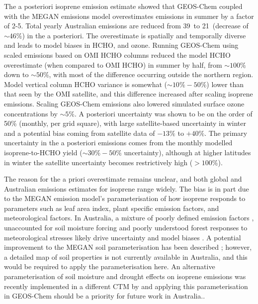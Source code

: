   The a posteriori isoprene emission estimate showed that GEOS-Chem coupled with the MEGAN emissions model overestimates emissions in summer by a factor of 2-5.
  Total yearly Australian emissions are reduced from 39\tgpyr ~to 21\tgpyr ~(decrease of $\sim{46}\%$) in the a posteriori.
  The overestimate is spatially and temporally diverse and leads to model biases in HCHO, and ozone.
  Running GEOS-Chem using scaled emissions based on OMI HCHO columns reduced the model HCHO overestimate (when compared to OMI HCHO) in summer by half, from $\sim{100\%}$ down to $\sim{50\%}$, with most of the difference occurring outside the northern region.
  Model vertical column HCHO variance is somewhat ($\sim{10\%-50\%}$) lower than that seen by the OMI satellite, and this difference increased after scaling isoprene emissions.
  Scaling GEOS-Chem emissions also lowered simulated surface ozone concentrations by $\sim 5\%$.
  A posteriori uncertainty was shown to be on the order of 50\%  (monthly, per grid square), with large satellite-based uncertainty in winter and a potential bias coming from satellite data of $-13\%$ to $+40\%$.
  The primary uncertainty in the a posteriori emissions comes from the monthly modelled isoprene-to-HCHO yield ($\sim 30\%-50\%$ uncertainty), although at higher latitudes in winter the satellite uncertainty becomes restrictively high ($>100\%$).
  
  
  
  The reason for the a priori overestimate remains unclear, and both global and Australian emissions estimates for isoprene range widely.
  The bias is in part due to the MEGAN emission model's parameterisation of how isoprene responds to parameters such as leaf area index, plant specific emission factors, and meteorological factors. 
  In Australia, a mixture of poorly defined emission factors \parencite[e.g.,][]{Emmerson2016}, unaccounted for soil moisture forcing \parencite[e.g.,][]{Sindelarova2014, Emmerson2019} and poorly understood forest responses to meteorological stresses likely drive uncertainty and model biases \parencite{Jiang2018,Emmerson2019}.
  A potential improvement to the MEGAN soil parameterisation has been described \parencite{Jiang2018}; however, a detailed map of soil properties is not currently available in Australia, and this would be required to apply the parameterisation here.
  An alternative parameterisation of soil moisture and drought effects on isoprene emissions was recently implemented in a different CTM by \textcite{Emmerson2019} and applying this parameterisation in GEOS-Chem should be a priority for future work in Australia..  



